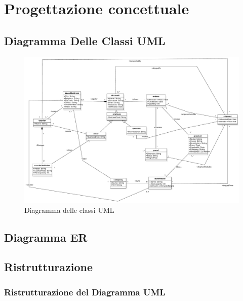 \section{Progettazione concettuale}

\subsection{Diagramma Delle Classi UML}

\begin{figure}[ht]
    \centering
    \includegraphics[scale=0.45]{imgs/umlConcettuale.pdf}
    \caption{Diagramma delle classi UML}
\end{figure}

\subsection{Diagramma ER}


\subsection{Ristrutturazione}



\subsubsection{Ristrutturazione del Diagramma UML}